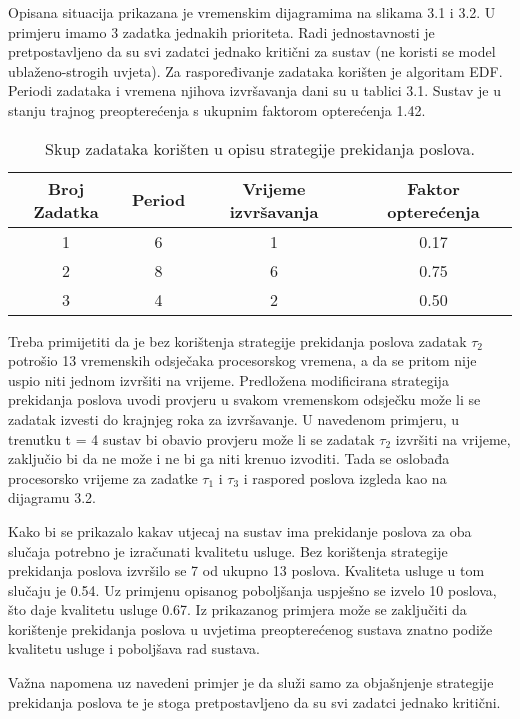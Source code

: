\documentclass[../zavrsni.tex]{subfiles}
\begin{document}
Opisana situacija prikazana je vremenskim dijagramima na slikama 3.1 i 3.2. U primjeru imamo 3 zadatka jednakih prioriteta. Radi jednostavnosti
je pretpostavljeno da su svi zadatci jednako kritični za sustav (ne koristi se model ublaženo-strogih uvjeta). Za raspoređivanje zadataka korišten je algoritam EDF. 
Periodi zadataka i vremena njihova izvršavanja dani su u tablici 3.1. Sustav je u stanju trajnog preopterećenja s ukupnim
faktorom opterećenja 1.42.

\begin{table}[h!]
\begin{center}
  \begin{tabular}{||c || c | c | c||} 
   \hline
   Broj Zadatka & Period & Vrijeme izvršavanja & Faktor opterećenja \\ [0.5ex] 
   \hline\hline
   1 & 6 & 1 & 0.17 \\ 
   \hline
   2 & 8 & 6 & 0.75 \\
   \hline
   3 & 4 & 2 & 0.50 \\
   \hline
  \end{tabular}
\end{center}
\caption{\label{tab:table-name}Skup zadataka korišten u opisu strategije prekidanja poslova.}
\end{table}

Treba primijetiti da je bez korištenja strategije prekidanja poslova zadatak $\tau_2$ potrošio 13 vremenskih odsječaka procesorskog vremena, a 
da se pritom nije uspio niti jednom izvršiti na vrijeme.
Predložena modificirana strategija prekidanja poslova uvodi provjeru u svakom vremenskom odsječku može li se zadatak izvesti do  krajnjeg roka 
za izvršavanje. 
U navedenom primjeru, u 
trenutku t = 4 sustav bi obavio provjeru može li se zadatak $\tau_2$ izvršiti na vrijeme, zaključio bi da ne može i ne bi ga niti krenuo
izvoditi. Tada se oslobađa procesorsko vrijeme za zadatke $\tau_1$ i $\tau_3$ i
raspored poslova izgleda kao na dijagramu 3.2. 

Kako bi se prikazalo kakav utjecaj na sustav ima prekidanje poslova za oba slučaja potrebno je izračunati kvalitetu usluge.
Bez korištenja strategije prekidanja poslova
izvršilo se 7 od ukupno 13 poslova. Kvaliteta usluge u tom slučaju je 0.54. Uz primjenu opisanog poboljšanja uspješno se izvelo 10 
poslova, što daje kvalitetu usluge 0.67. Iz prikazanog primjera može se zaključiti da korištenje prekidanja poslova u uvjetima 
preopterećenog sustava znatno podiže kvalitetu usluge i poboljšava rad sustava.

Važna napomena uz navedeni primjer je da služi samo za objašnjenje strategije prekidanja poslova te je stoga 
pretpostavljeno da su svi zadatci jednako kritični.
\end{document}
